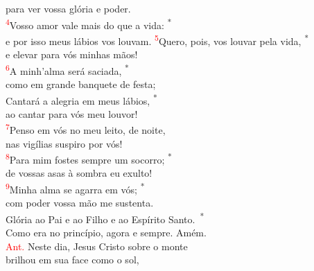 \documentclass{book}
\begin{document}
\begin{center}
    para ver vossa glória e poder. \\
    \textsuperscript{\underline{\hspace{.06in}}\textcolor{red}{4}}Vosso amor vale mais do que a vida: \textsuperscript{*} \\
    e por isso meus lábios vos louvam.
    \newpage
    \textsuperscript{\underline{\hspace{.06in}}\textcolor{red}{5}}Quero, pois, vos louvar pela vida, \textsuperscript{*} \\
    e elevar para vós minhas mãos! \\
    \textsuperscript{\underline{\hspace{.06in}}\textcolor{red}{6}}A minh'alma será saciada, \textsuperscript{*} \\
    como em grande banquete de festa; \\
    \textsuperscript{\underline{\hspace{.06in}}} Cantará a alegria em meus lábios, \textsuperscript{*} \\
    ao cantar para vós meu louvor!
    \vspace{.2cm} \\
    \textsuperscript{\underline{\hspace{.06in}}\textcolor{red}{7}}Penso em vós no meu leito, de noite, \\
    nas vigílias suspiro por vós! \\
    \textsuperscript{\underline{\hspace{.06in}}\textcolor{red}{8}}Para mim fostes sempre um socorro; \textsuperscript{*} \\
    de vossas asas à sombra eu exulto! \\
    \textsuperscript{\underline{\hspace{.06in}}\textcolor{red}{9}}Minha alma se agarra em vós; \textsuperscript{*} \\
    com poder vossa mão me sustenta.
    \vspace{.2cm} \\
    \textsuperscript{\underline{\hspace{.06in}}} Glória ao Pai e ao Filho e ao Espírito Santo.\ \textsuperscript{*} \\
    Como era no princípio, agora e sempre. Amém.
    \vspace{.2cm} \\
    \textcolor{red}{Ant.} Neste dia, Jesus Cristo sobre o monte \\
    brilhou em sua face como o sol, \\

\end{center}
\end{document}
